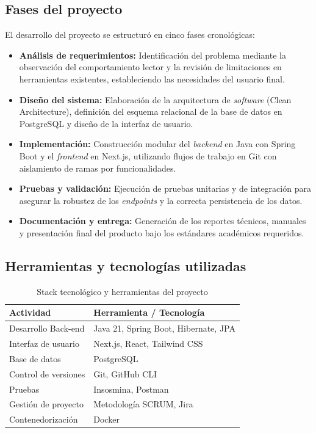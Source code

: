 \documentclass[12pt, atypical, journal]{article}
\begin{document}
\subsection{Fases del proyecto}
El desarrollo del proyecto se estructuró en cinco fases cronológicas:
\begin{itemize}
    \item \textbf{Análisis de requerimientos:} Identificación del problema mediante la observación del comportamiento lector y la revisión de limitaciones en herramientas existentes, estableciendo las necesidades del usuario final.
    \item \textbf{Diseño del sistema:} Elaboración de la arquitectura de \textit{software} (Clean Architecture), definición del esquema relacional de la base de datos en PostgreSQL y diseño de la interfaz de usuario.
    \item \textbf{Implementación:} Construcción modular del \textit{backend} en Java con Spring Boot y el \textit{frontend} en Next.js, utilizando flujos de trabajo en Git con aislamiento de ramas por funcionalidades.
    \item \textbf{Pruebas y validación:} Ejecución de pruebas unitarias y de integración para asegurar la robustez de los \textit{endpoints} y la correcta persistencia de los datos.
    \item \textbf{Documentación y entrega:} Generación de los reportes técnicos, manuales y presentación final del producto bajo los estándares académicos requeridos.
\end{itemize}

\subsection{Herramientas y tecnologías utilizadas}

\begin{table}[h]
\centering
\caption{Stack tecnológico y herramientas del proyecto}
\label{tab:tecnologias}
\begin{tabular}{ll}
\toprule
\textbf{Actividad} & \textbf{Herramienta / Tecnología} \\
\midrule
Desarrollo Back-end & Java 21, Spring Boot, Hibernate, JPA \\
Interfaz de usuario & Next.js, React, Tailwind CSS \\
Base de datos & PostgreSQL \\
Control de versiones & Git, GitHub CLI \\
Pruebas & Insosmina, Postman  \\ %
Gestión de proyecto & Metodología SCRUM, Jira \\
Contenedorización & Docker \\
\bottomrule
\end{tabular}
\end{table}
\end{document}
